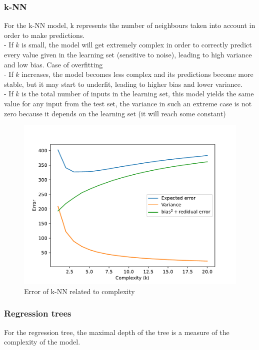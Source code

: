 \documentclass[12pt,titlepage]{article}
\begin{document}
\subsubsection{k-NN}
For the k-NN model, k represents the number of neighbours taken into account in order to make
predictions. \\
- If $k$ is small, the model will get extremely complex in order to correctly predict every value given in the learning set (sensitive to noise), leading to high variance and low bias. Case of overfitting \\
- If $k$ increases, the model becomes less complex and its predictions become more stable, but it may start to underfit, leading to higher bias and lower variance. \\
- If $k$ is the total number of inputs in the learning set, this model yields the same value for any input from the test set, the variance in such an extreme case is not zero because it depends on the learning set (it will reach some constant)


\begin{figure}[H]
    \centering
    \includegraphics[scale = 0.8]{image/2.3_knn_regressor.pdf}
    \caption{Error of k-NN related to complexity}
    \label{fig:error_knn}
\end{figure}

\subsubsection{Regression trees}
For the regression tree, the maximal
depth of the tree is a measure of the complexity of the model.
\end{document}
